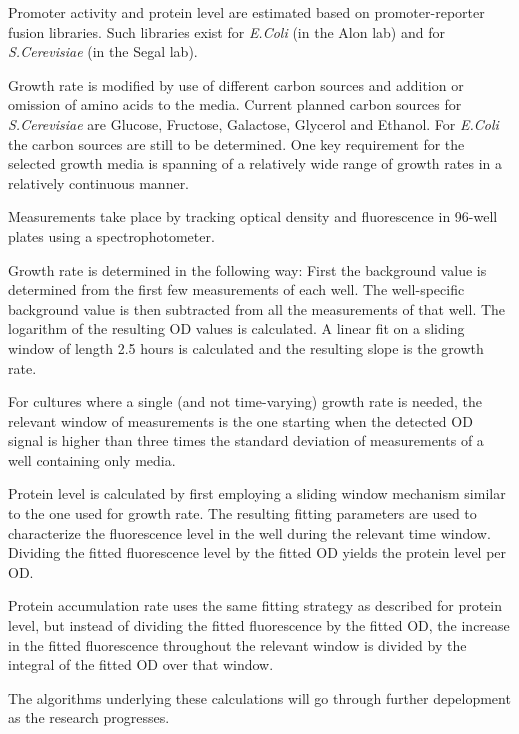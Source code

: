 \documentclass[a4page,notitlepage]{article}
\begin{document}
Promoter activity and protein level are estimated based on promoter-reporter fusion libraries.
Such libraries exist for \emph{E.Coli} (in the Alon lab) and for \emph{S.Cerevisiae} (in the Segal lab).

Growth rate is modified by use of different carbon sources and addition or omission of amino acids to the media.
Current planned carbon sources for \emph{S.Cerevisiae} are Glucose, Fructose, Galactose, Glycerol and Ethanol.
For \emph{E.Coli} the carbon sources are still to be determined.
One key requirement for the selected growth media is spanning of a relatively wide range of growth rates in a relatively continuous manner.

Measurements take place by tracking optical density and fluorescence in 96-well plates using a spectrophotometer.

Growth rate is determined in the following way:
First the background value is determined from the first few measurements of each well.
The well-specific background value is then subtracted from all the measurements of that well.
The logarithm of the resulting OD values is calculated.
A linear fit on a sliding window of length 2.5 hours is calculated and the resulting slope is the growth rate.

For cultures where a single (and not time-varying) growth rate is needed, the relevant window of measurements is the one starting when the detected OD signal is higher than three times the standard deviation of measurements of a well containing only media.

Protein level is calculated by first employing a sliding window mechanism similar to the one used for growth rate.
The resulting fitting parameters are used to characterize the fluorescence level in the well during the relevant time window.
Dividing the fitted fluorescence level by the fitted OD yields the protein level per OD.

Protein accumulation rate uses the same fitting strategy as described for protein level, but instead of dividing the fitted fluorescence by the fitted OD, the increase in the fitted fluorescence throughout the relevant window is divided by the integral of the fitted OD over that window.

The algorithms underlying these calculations will go through further depelopment as the research progresses.
\printbibliography
\end{document}
